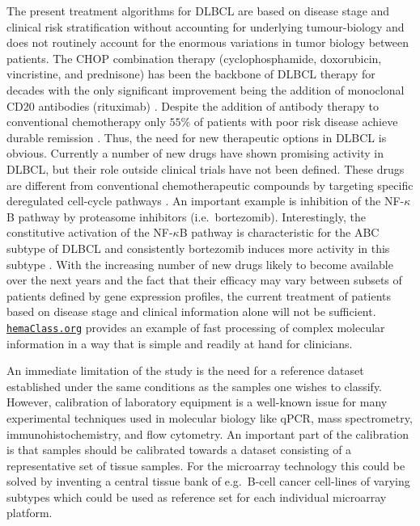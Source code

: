 \documentclass{bmcart}
\newcommand{\hemaClass}{\href{http://hemaClass.org}{\texttt{hemaClass.org}}}
\begin{document}
The present treatment algorithms for DLBCL are based on disease stage and clinical risk stratification without accounting for underlying tumour-biology \citep{Schmoll2012} and does not routinely account for the enormous variations in tumor biology between patients.
The CHOP combination therapy (cyclophosphamide, doxorubicin, vincristine, and prednisone) has been the backbone of DLBCL therapy for decades with the only significant improvement being the addition of monoclonal CD20 antibodies (rituximab) \citep{Coiffier2002a}.
Despite the addition of antibody therapy to conventional chemotherapy only $55\%$ of patients with poor risk disease achieve durable remission \citep{Ziepert2010}.
Thus, the need for new therapeutic options in DLBCL is obvious.
Currently a number of new drugs have shown promising activity in DLBCL, but their role outside clinical trials have not been defined.
These drugs are different from conventional chemotherapeutic compounds by targeting specific deregulated cell-cycle pathways \citep{Friedberg2011}.
An important example is inhibition of the NF-$\kappa$B pathway by proteasome inhibitors (i.e.\ bortezomib).
Interestingly, the constitutive activation of the NF-$\kappa$B pathway is characteristic for the ABC subtype of DLBCL and consistently bortezomib induces more activity in this subtype \citep{Nogai2013}.
With the increasing number of new drugs likely to become available over the next years and the fact that their efficacy may vary between subsets of patients defined by gene expression profiles, the current treatment of patients based on disease stage and clinical information alone will not be sufficient.
\hemaClass{} provides an example of fast processing of complex molecular information in a way that is simple and readily at hand for clinicians.

An immediate limitation of the study is the need for a reference dataset established under the same conditions as the samples one wishes to classify.
However, calibration of laboratory equipment is a well-known issue for many experimental techniques used in molecular biology like qPCR, mass spectrometry, immunohistochemistry, and flow cytometry.
An important part of the calibration is that samples should be calibrated towards a dataset consisting of a representative set of tissue samples.
For the microarray technology this could be solved by inventing a central tissue bank of e.g.\ B-cell cancer cell-lines of varying subtypes which could be used as reference set for each individual microarray platform.
\end{document}
